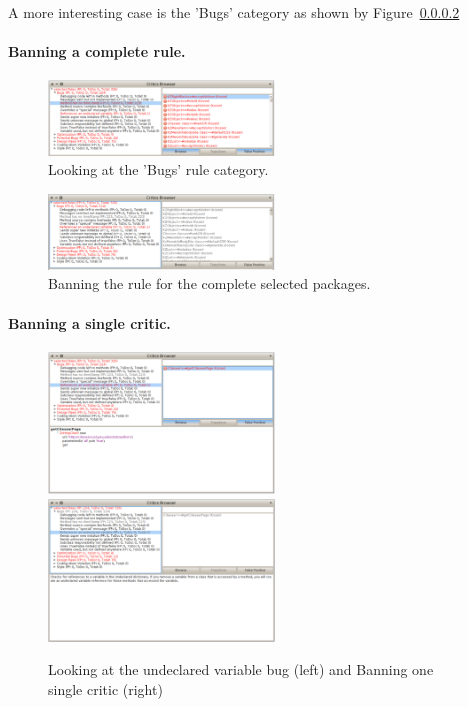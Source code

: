 \documentclass[a4paper,10pt,twoside]{book}
\begin{document}
A more interesting case is the 'Bugs' category as shown by Figure~\ref{}



\paragraph{Banning a complete rule.}

\begin{figure}[h]
\centering
\includegraphics[width=6cm]{LookingAtBugs}
\caption{Looking at the 'Bugs' rule category.}
\end{figure}


\begin{figure}[h]
\centering
\includegraphics[width=6cm]{BanningTimeStampRules}
\caption{Banning the rule for the complete selected packages.}
\end{figure}


\paragraph{Banning a single critic.}

\begin{figure}[h]
\centering
\includegraphics[width=6cm]{OneUndeclaredRefence}\includegraphics[width=6cm]{BanningOneViolation}
\caption{Looking at the undeclared variable bug (left) and Banning one single critic (right)}
\end{figure}
\end{document}
